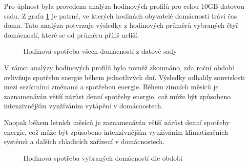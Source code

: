 \documentclass[FM,BP,fonts]{tulthesis}
\begin{document}
Pro úplnost byla provedena analýza hodinových profilů pro celou 10GB datovou sadu. Z grafu \ref{fig:hodina_all} je patrné, ve kterých hodinách obyvatelé domácnosti tráví čas doma. Tato analýza potvrzuje výsledky z hodinových průměrů vybraných čtyř domácností, které se od průměru příliš neliší.

\begin{figure}[htbp]
	\centering
	\caption{Hodinová spotřeba všech domácností z datové sady}
	\label{fig:hodina_all}
\end{figure}

V rámci analýzy hodinových profilů bylo rovněž zkoumáno, zda roční období ovlivňuje spotřebu energie během jednotlivých dní. Výsledky odhalily souvislosti mezi sezónními změnami a spotřebou energie. Během zimních měsíců je zaznamenáván větší nárůst denní spotřeby energie, což může být způsobeno intenzivnějším využíváním vytápění v domácnostech.

Naopak během letních měsíců je zaznamenáván větší nárůst denní spotřeby energie, což může být způsobeno intenzivnějším využíváním klimatizačních systémů a dalších chladicích zařízení v domácnostech. \newpage

\begin{figure}[htbp]
	\centering
	\caption{Hodinová spotřeba vybraných domácností dle období}
	\label{fig:hodina_quarters}
\end{figure}
\end{document}
